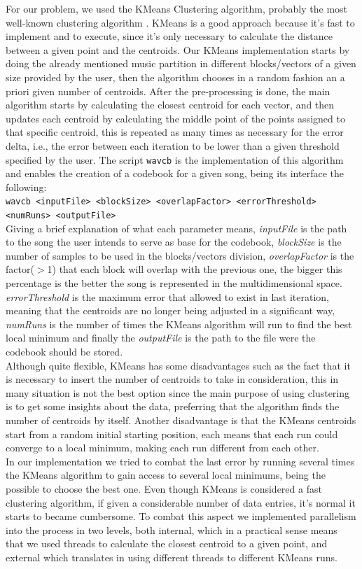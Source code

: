 \documentclass[12pt]{article}
\begin{document}
For our problem, we used the KMeans Clustering algorithm, probably the most well-known clustering algorithm \cite{clustering}. KMeans is a good approach because it's fast to implement and to execute, since it's only necessary to calculate the distance between a given point and the centroids. 
Our KMeans implementation starts by doing the already mentioned music partition in different blocks/vectors of a given size provided by the user, then the algorithm chooses in a random fashion an a priori given number of centroids. After the pre-processing is done, the main algorithm starts by calculating the closest centroid for each vector, and then updates each centroid by calculating the middle point of the points assigned to that specific centroid, this is repeated as many times as necessary for the error delta, i.e., the error between each iteration to be lower than a given threshold specified by the user. The script \texttt{wavcb} is the implementation of this algorithm and enables the creation of a codebook for a given song, being its interface the following:\\
\texttt{wavcb <inputFile> <blockSize> <overlapFactor> <errorThreshold>\\<numRuns> <outputFile>}\\
Giving a brief explanation of what each parameter means, \textit{inputFile} is the path to the song the user intends to serve as base for the codebook, \textit{blockSize} is the number of samples to be used in the blocks/vectors division, \textit{overlapFactor} is the factor($>$1) that each block will overlap with the previous one, the bigger this percentage is the better the song is represented in the multidimensional space. \textit{errorThreshold} is the maximum error that allowed to exist in last iteration, meaning that the centroids are no longer being adjusted in a significant way, \textit{numRuns} is the number of times the KMeans algorithm will run to find the best local minimum and finally the \textit{outputFile} is the path to the file were the codebook should be stored.\\
Although quite flexible, KMeans has some disadvantages such as the fact that it is necessary to insert the number of centroids to take in consideration, this in many situation is not the best option since the main purpose of using clustering is to get some insights about the data, preferring that the algorithm finds the number of centroids by itself. Another disadvantage is that the KMeans centroids start from a random initial starting position, each means that each run could converge to a local minimum, making each run different from each other.\\
In our implementation we tried to combat the last error by running several times the KMeans algorithm to gain access to several local minimums, being the possible to choose the best one. Even though KMeans is considered a fast clustering algorithm, if given a considerable number of data entries, it's normal it starts to became cumbersome. To combat this aspect we implemented parallelism into the process in two levels, both internal, which in a practical sense means that we used threads to calculate the closest centroid to a given point, and external which translates in using different threads to different KMeans runs.
\end{document}
